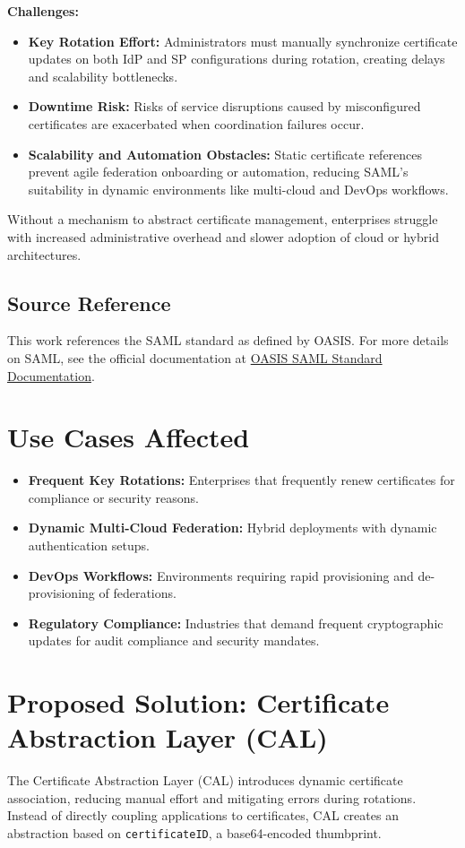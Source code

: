 \documentclass{article}
\begin{document}
\textbf{Challenges:}
\begin{itemize}
    \item \textbf{Key Rotation Effort:} Administrators must manually synchronize certificate updates on both IdP and SP configurations during rotation, creating delays and scalability bottlenecks.
    \item \textbf{Downtime Risk:} Risks of service disruptions caused by misconfigured certificates are exacerbated when coordination failures occur.
    \item \textbf{Scalability and Automation Obstacles:} Static certificate references prevent agile federation onboarding or automation, reducing SAML’s suitability in dynamic environments like multi-cloud and DevOps workflows.
\end{itemize}

Without a mechanism to abstract certificate management, enterprises struggle with increased administrative overhead and slower adoption of cloud or hybrid architectures.

\subsection*{Source Reference}
This work references the SAML standard as defined by OASIS. For more details on SAML, see the official documentation at \href{https://www.oasis-open.org/standard/saml/}{OASIS SAML Standard Documentation}.


\section*{Use Cases Affected}
\begin{itemize}
    \item \textbf{Frequent Key Rotations:} Enterprises that frequently renew certificates for compliance or security reasons.
    \item \textbf{Dynamic Multi-Cloud Federation:} Hybrid deployments with dynamic authentication setups.
    \item \textbf{DevOps Workflows:} Environments requiring rapid provisioning and de-provisioning of federations.
    \item \textbf{Regulatory Compliance:} Industries that demand frequent cryptographic updates for audit compliance and security mandates.
\end{itemize}

\section*{Proposed Solution: Certificate Abstraction Layer (CAL)}
The Certificate Abstraction Layer (CAL) introduces dynamic certificate association, reducing manual effort and mitigating errors during rotations. Instead of directly coupling applications to certificates, CAL creates an abstraction based on \texttt{certificateID}, a base64-encoded thumbprint.
\end{document}
